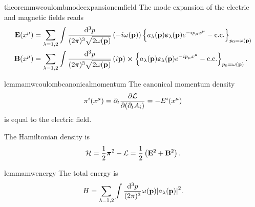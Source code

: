 \begin{restatable}{theorem}{mwcoulombmodeexpansionemfield}\label{thm:mw_coulomb_mode_expansion_em_field}
	The mode expansion of the electric and magnetic fields reads
	\begin{align}
		\vb{E}(x^\mu)
		&=
		\sum_{\lambda=1,2}
		\int\frac{\dd[3]{p}}{(2\pi)^3\sqrt{2\omega(\vb{p})}}
		\left(
			-i
			\omega(\vb{p})
		\right)
		\left\{
			a_\lambda(\vb{p})
			\boldsymbol{\varepsilon}_\lambda(\vb{p})
			e^{-ip_\mu x^\mu}
			-
			\text{c.c.}
		\right\}_{p_0=\omega(\vb{p})}
		\\
		\vb{B}(x^\mu)
		&=
		\sum_{\lambda=1,2}
		\int\frac{\dd[3]{p}}{(2\pi)^3\sqrt{2\omega(\vb{p})}}
		\left(
			i\vb{p}
		\right)
		\cross
		\left\{
			a_\lambda(\vb{p})
			\boldsymbol{\varepsilon}_\lambda(\vb{p})
			e^{-ip_\mu x^\mu}
			-
			\text{c.c.}
		\right\}_{p_0=\omega(\vb{p})}
		\label{eq:mw_coulomb_mode_expansion_em_field}
		.
	\end{align}
\end{restatable}
\begin{restatable}{lemma}{mwcoulombcanonicalmomentum}
	The canonical momentum density
	\begin{equation}
		\pi^i(x^\mu)
		=
		\partial_t
		\pdv{\mathcal{L}}{(\partial_tA_i)}
		=
		-
		E^i(x^\mu)
		\label{eq:mw_coulomb_canonical_momentum}
	\end{equation}
	is equal to the electric field.
\end{restatable}
\begin{corollary}\label{thm:mw_hamiltonian}
	The Hamiltonian density is
	\begin{equation}
		\mathcal{H}
		=
		\frac{1}{2}
		\boldsymbol{\pi}^2
		-
		\mathcal{L}
		=
		\frac{1}{2}
		\left(
			\vb{E}^2
			+
			\vb{B}^2
		\right)
		\label{thm:mw_hamiltonian}
		.
	\end{equation}
\end{corollary}
\begin{restatable}{lemma}{mwenergy}\label{thm:mw_energy}
	The total energy is
	\begin{equation}
		H
		=
		\sum_{\lambda=1,2}
		\int\frac{\dd[3]{p}}{(2\pi)^3}
		\omega(\vb{p})
		\abs{a_\lambda(\vb{p})}^2
		\label{thm:mw_energy}
		.
	\end{equation}
\end{restatable}